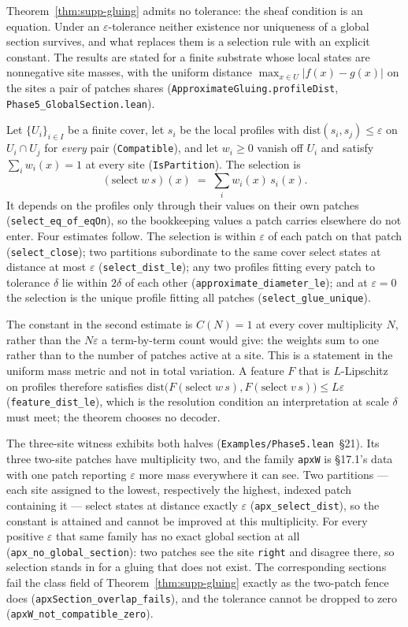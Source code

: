 \documentclass{article}
\begin{document}
Theorem~\ref{thm:supp-gluing} admits no tolerance: the sheaf condition is an equation. Under an
$\varepsilon$-tolerance neither existence nor uniqueness of a global section
survives, and what replaces them is a selection rule with an explicit constant.
The results are stated for a finite substrate whose local states are nonnegative
site masses, with the uniform distance $\max_{x\in U}|f(x)-g(x)|$ on the sites a
pair of patches shares (\nolinkurl{ApproximateGluing.profileDist},
\nolinkurl{Phase5_GlobalSection.lean}).

Let $\{U_i\}_{i\in I}$ be a finite cover, let $s_i$ be the local profiles with
$\mathrm{dist}(s_i,s_j)\leq\varepsilon$ on $U_i\cap U_j$ for \emph{every} pair
(\texttt{Compatible}), and let $w_i\geq0$ vanish off $U_i$ and satisfy
$\sum_i w_i(x)=1$ at every site (\texttt{IsPartition}). The selection is
\[
(\mathrm{select}\;w\,s)(x)\;=\;\sum_{i} w_i(x)\,s_i(x).
\]
It depends on the profiles only through their values on their own patches
(\nolinkurl{select_eq_of_eqOn}), so the
bookkeeping values a patch carries elsewhere do not enter. Four estimates follow.
The selection is within $\varepsilon$ of each patch on that patch
(\nolinkurl{select_close}); two partitions subordinate to the same
cover select states at distance at most $\varepsilon$
(\nolinkurl{select_dist_le}); any two profiles fitting
every patch to tolerance $\delta$ lie within $2\delta$ of each other
(\nolinkurl{approximate_diameter_le}); and at
$\varepsilon=0$ the selection is the unique profile fitting all patches
(\nolinkurl{select_glue_unique}).

The constant in the second estimate is $C(N)=1$ at every cover multiplicity $N$,
rather than the $N\varepsilon$ a term-by-term count would give: the weights sum
to one rather than to the number of patches active at a site. This is a
statement in the uniform mass metric and not in total variation. A feature
$F$ that is $L$-Lipschitz on profiles therefore satisfies
$\mathrm{dist}\big(F(\mathrm{select}\;w\,s),F(\mathrm{select}\;v\,s)\big)\leq
L\varepsilon$ (\nolinkurl{feature_dist_le}), which is
the resolution condition an interpretation at scale $\delta$ must meet; the
theorem chooses no decoder.

The three-site witness exhibits both halves
(\nolinkurl{Examples/Phase5.lean}~\S21). Its three
two-site patches have multiplicity two, and the family \texttt{apxW} is
\S17.1's data with one patch reporting $\varepsilon$ more mass everywhere it can
see. Two partitions --- each site assigned to the lowest, respectively the
highest, indexed patch containing it --- select states at distance exactly
$\varepsilon$ (\nolinkurl{apx_select_dist}), so the
constant is attained and cannot be improved at this multiplicity. For every
positive $\varepsilon$ that same family has no exact global section at all
(\nolinkurl{apx_no_global_section}): two
patches see the site \texttt{right} and disagree there, so selection stands in
for a gluing that does not exist. The corresponding sections fail the class
field of Theorem~\ref{thm:supp-gluing} exactly as the two-patch fence does
(\nolinkurl{apxSection_overlap_fails}), and the tolerance
cannot be dropped to zero
(\nolinkurl{apxW_not_compatible_zero}).
\end{document}
